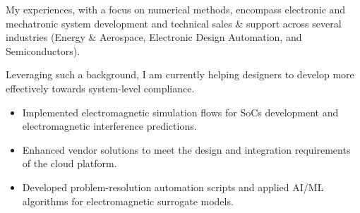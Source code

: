 \documentclass[9pt,a4paper,ragged2e,withhyper]{altacv} %
\begin{document}
\begin{paracol}{2}
My experiences, with a focus on numerical methods, encompass electronic and
mechatronic system development and technical sales \& support across several
industries (Energy \& Aerospace, Electronic Design Automation, and Semiconductors).

\medskip

Leveraging such a background, I am currently helping designers to develop more
effectively towards system-level compliance.



\begin{itemize}

\item Implemented electromagnetic simulation flows for SoCs development and electromagnetic interference
predictions.
\item Enhanced vendor solutions to meet the design and integration requirements of the cloud platform.
\item Developed problem-resolution automation scripts and applied AI/ML algorithms for
electromagnetic surrogate models.
\end{itemize}
\divider


\end{paracol}
\end{document}
